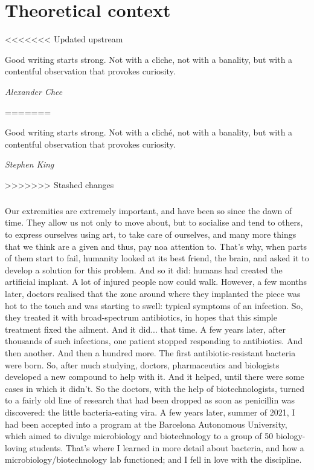 \chapter{Theoretical context}
<<<<<<< Updated upstream
\epigraph{Good writing starts strong. Not with a cliche, not with a banality, but with a contentful observation that provokes curiosity.}{\textit{Alexander Chee}}
=======
\epigraph{Good writing starts strong. Not with a cliché, not with a banality, but with a contentful observation that provokes curiosity.}{\textit{Stephen King}}
>>>>>>> Stashed changes
\paragraph{}Our extremities are extremely important, and have been so since the dawn of time. They allow us not only to move about, but to socialise and tend to others, to express ourselves using art, to take care of ourselves, and many more things that we think are a given and thus, pay noa attention to. That's why, when parts  of them start to fail, humanity looked at its best friend, the brain, and asked it to develop a solution for this problem. And so it did: humans had created the artificial implant. A lot of injured people now could walk. However, a few months later, doctors realised that the zone around where they implanted the piece was hot to the touch and was starting to swell: typical symptoms of an infection. So, they treated it with broad-spectrum antibiotics, in hopes that this simple treatment fixed the ailment. And it did... that time. A few years later, after thousands of such infections, one patient stopped responding to antibiotics. And then another. And then a hundred more. The first antibiotic-resistant bacteria were born. So, after much studying, doctors, pharmaceutics and biologists developed a new compound to help with it. And it helped, until there were some cases in which it didn't. So the doctors, with the help of biotechnologists, turned to a fairly old line of research that had been dropped as soon as penicillin was discovered: the little bacteria-eating vira.\newline
A few years later, summer of 2021, I had been accepted into a program at the Barcelona Autonomous University, which aimed to divulge microbiology and biotechnology to a group of 50 biology-loving students. That's where I learned in more detail about bacteria, and how a microbiology/biotechnology lab functioned; and I fell in love with the discipline. 

